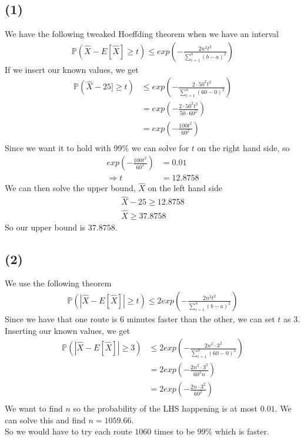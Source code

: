 \documentclass[a4paper]{article}
\begin{document}
\subsection*{(1)}
We have the following tweaked Hoeffding theorem when we have an interval
\begin{align}
\mathbb{P}(\hat{X}-E[\hat{X}]\geq t)\leq exp\left(-\frac{2n^2t^2}{\sum_{i= 1}^n (b-a)^2}\right)
\end{align}
If we insert our known values, we get
\begin{align*}
\mathbb{P}(\hat{X}-25]\geq t)&\leq exp\left(-\frac{2\cdot 50^2t^2}{\sum_{i= 1}^n (60-0)^2}\right) \\
&= exp\left(-\frac{2\cdot 50^2t^2}{50\cdot 60^2}\right) \\
&= exp\left(-\frac{100t^2}{ 60^2}\right) \\
\end{align*}
Since we want it to hold with 99\% we can solve for $t$ on the right hand side, so
\begin{align*}
exp\left(-\frac{100t^2}{ 60^2}\right) &= 0.01 \\
\Rightarrow t&=12.8758
\end{align*}
We can then solve the upper bound, $\hat{X}$ on the left hand side
\begin{align*}
\hat{X}-25\geq 12.8758 \\
\hat{X}\geq 37.8758
\end{align*}
So our upper bound is $37.8758$.

\subsection*{(2)}
We use the following theorem
\begin{align*}
\mathbb{P}(|\hat{X}-E[\hat{X}]|\geq t)\leq 2exp\left(-\frac{2n^2t^2}{\sum_{i= 1}^n (b-a)^2}\right)
\end{align*}
Since we have that one route is $6$ minutes faster than the other, we can set $t$ as $3$. Inserting our known values, we get
\begin{align*}
\mathbb{P}(|\hat{X}-E[\hat{X}]|\geq 3)&\leq 2exp\left(-\frac{2n^2\cdot 3^2}{\sum_{i= 1}^n (60-0)^2}\right) \\
&= 2exp\left(-\frac{2n^2\cdot 3^2}{60^2n}\right) \\
&= 2exp\left(-\frac{2n\cdot 3^2}{60^2}\right) \\
\end{align*}
We want to find $n$ so the probability of the LHS happening is at most $0.01$. We can solve this and find $n=1059.66$.\\
So we would have to try each route $1060$ times to be $99$\% which is faster.
\end{document}
